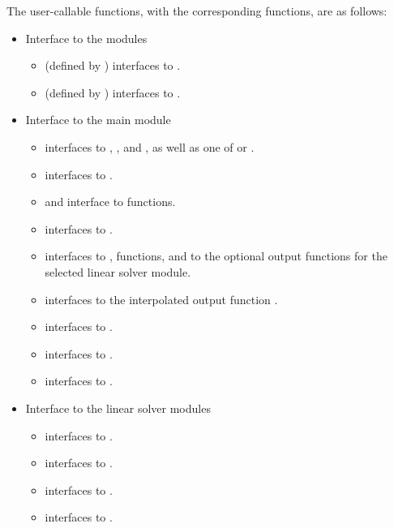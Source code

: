 The user-callable functions, with the corresponding {\cvode} functions,
are as follows:
\begin{itemize}
\item
  Interface to the {\nvector} modules
  \begin{itemize}
  \item {} (defined by {\nvecs}) 
    interfaces to .
  \item {} (defined by {\nvecp}) 
    interfaces to .
  \end{itemize}
\item Interface to the main {\cvode} module
  \begin{itemize}
  \item {}
    interfaces to , , and ,
    as well as one of  or .
  \item {}  
    interfaces to .
  \item {} and 
    interface to  functions.
  \item {}    
    interfaces to .
  \item {}
    interfaces to ,  functions, and to the optional
    output functions for the selected linear solver module.
  \item {}     
    interfaces to the interpolated output function .
  \item {}
    interfaces to .
  \item {}
    interfaces to .
  \item {}    
    interfaces to .
  \end{itemize}  
\item Interface to the linear solver modules
  \begin{itemize}
  \item {}    
    interfaces to .
  \item {}
    interfaces to .
  \item {}
    interfaces to .
  \item {}
    interfaces to .

\end{itemize}
\end{itemize}
